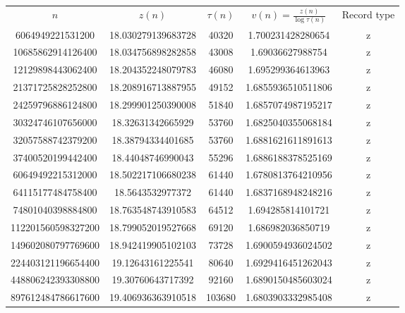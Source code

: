 \documentclass{article}
\begin{document}
    \begin{center}
\begin{tabular}{ |c|c|c|c|c| } 
 \hline
$n$ & $z(n)$ & $\tau(n)$  & $v(n)=\frac{z(n)}{\log \tau(n)}$ & Record type  \\ 
6064949221531200 & 18.030279139683728 & 40320 & 1.700231428280654 & z\\
10685862914126400 & 18.034756898282858 & 43008 &  1.69036627988754 &z\\
12129898443062400 &  18.204352248079783	& 46080 & 1.695299364613963 & z\\
21371725828252800 & 18.208916713887955 & 49152 & 1.6855936510511806	& z\\ 24259796886124800 & 18.299901250390008 & 51840 & 1.6857074987195217	& z\\
30324746107656000 & 18.32631342665929 & 53760 & 1.6825040355068184 & z\\
32057588742379200 &  18.38794334401685 & 53760 & 1.6881621611891613	& z\\
37400520199442400 & 18.44048746990043 & 55296 & 1.6886188378525169& z\\
60649492215312000 & 18.502217106680238	&  61440 & 1.6780813764210956 & z\\
64115177484758400 &  18.5643532977372&  61440 & 1.6837168948248216 & z\\
74801040398884800 & 18.763548743910583 &  64512 & 1.694285814101721	 & z\\
112201560598327200 & 18.799052019527668	 & 69120 & 1.686982036850719& z\\	
149602080797769600 & 18.942419905102103	&  73728 & 1.6900594936024502 & z\\
224403121196654400 & 19.12643161225541 &  80640 & 1.6929416451262043 & z\\	448806242393308800 & 19.30760643717392	&  92160 & 1.6890150485603024 & z\\	
897612484786617600 &  19.406936363910518 & 103680 &  1.6803903332985408	& z\\
\hline
\end{tabular}
\end{center}
\end{document}
